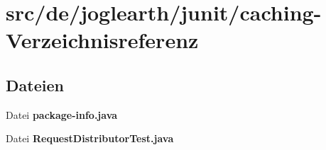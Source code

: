 \section{src/de/joglearth/junit/caching-\/\-Verzeichnisreferenz}
\label{dir_188bd7f0f4123deb8d24cf02c142462e}
\subsection*{Dateien}
\begin{DoxyCompactItemize}
\item 
Datei {\bfseries package-\/info.\-java}
\item 
Datei {\bfseries Request\-Distributor\-Test.\-java}
\end{DoxyCompactItemize}
